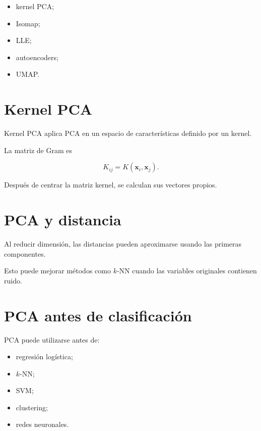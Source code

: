 \documentclass[
  spanish,
  10.5pt,
  letterpaper,
  DIV=11,
  numbers=noendperiod,
  oneside,
  open=any]{scrreprt}
\providecommand{\tightlist}{%
  \setlength{\itemsep}{0pt}\setlength{\parskip}{0pt}}
\theoremstyle{definition}
\theoremstyle{definition}
\theoremstyle{plain}
\theoremstyle{remark}
\begin{document}
\begin{itemize}
\tightlist
\item
  kernel PCA;
\item
  Isomap;
\item
  LLE;
\item
  autoencoders;
\item
  UMAP.
\end{itemize}

\section*{Kernel PCA}\label{kernel-pca}


Kernel PCA aplica PCA en un espacio de características definido por un
kernel.

La matriz de Gram es

\[
K_{ij}
=
K(\mathbf{x}_i,\mathbf{x}_j).
\]

Después de centrar la matriz kernel, se calculan sus vectores propios.

\section*{PCA y distancia}\label{pca-y-distancia}


Al reducir dimensión, las distancias pueden aproximarse usando las
primeras componentes.

Esto puede mejorar métodos como \(k\)-NN cuando las variables originales
contienen ruido.

\section*{PCA antes de
clasificación}\label{pca-antes-de-clasificaciuxf3n}


PCA puede utilizarse antes de:

\begin{itemize}
\tightlist
\item
  regresión logística;
\item
  \(k\)-NN;
\item
  SVM;
\item
  clustering;
\item
  redes neuronales.
\end{itemize}
\end{document}
